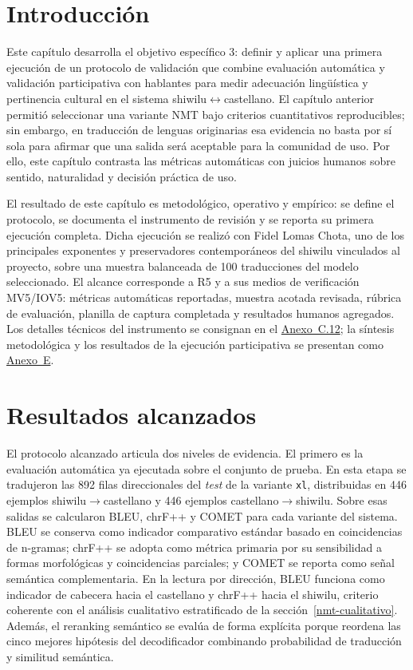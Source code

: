 \documentclass[12pt,a4paper,oneside]{book}
\begin{document}
\section{Introducción}\label{protocolo-introduccion}

Este capítulo desarrolla el objetivo específico 3: definir y aplicar una primera ejecución de un protocolo de validación que combine evaluación automática y validación participativa con hablantes para medir adecuación lingüística y pertinencia cultural en el sistema shiwilu$\leftrightarrow$castellano. El capítulo anterior permitió seleccionar una variante NMT bajo criterios cuantitativos reproducibles; sin embargo, en traducción de lenguas originarias esa evidencia no basta por sí sola para afirmar que una salida será aceptable para la comunidad de uso. Por ello, este capítulo contrasta las métricas automáticas con juicios humanos sobre sentido, naturalidad y decisión práctica de uso.

El resultado de este capítulo es metodológico, operativo y empírico: se define el protocolo, se documenta el instrumento de revisión y se reporta su primera ejecución completa. Dicha ejecución se realizó con Fidel Lomas Chota, uno de los principales exponentes y preservadores contemporáneos del shiwilu vinculados al proyecto, sobre una muestra balanceada de 100 traducciones del modelo seleccionado. El alcance corresponde a R5 y a sus medios de verificación MV5/IOV5: métricas automáticas reportadas, muestra acotada revisada, rúbrica de evaluación, planilla de captura completada y resultados humanos agregados. Los detalles técnicos del instrumento se consignan en el \hyperref[anexo-nmt-human-eval]{Anexo~C.12}; la síntesis metodológica y los resultados de la ejecución participativa se presentan como \hyperref[anexo-validacion-participativa]{Anexo~E}.

\section{Resultados alcanzados}\label{nmt-eval-humana}

El protocolo alcanzado articula dos niveles de evidencia. El primero es la evaluación automática ya ejecutada sobre el conjunto de prueba. En esta etapa se tradujeron las 892 filas direccionales del \emph{test} de la variante \texttt{xl}, distribuidas en 446 ejemplos shiwilu\(\rightarrow\)castellano y 446 ejemplos castellano\(\rightarrow\)shiwilu. Sobre esas salidas se calcularon BLEU, chrF++ y COMET para cada variante del sistema. BLEU se conserva como indicador comparativo estándar basado en coincidencias de n-gramas; chrF++ se adopta como métrica primaria por su sensibilidad a formas morfológicas y coincidencias parciales; y COMET se reporta como señal semántica complementaria. En la lectura por dirección, BLEU funciona como indicador de cabecera hacia el castellano y chrF++ hacia el shiwilu, criterio coherente con el análisis cualitativo estratificado de la sección~\ref{nmt-cualitativo}. Además, el reranking semántico se evalúa de forma explícita porque reordena las cinco mejores hipótesis del decodificador combinando probabilidad de traducción y similitud semántica.
\end{document}

